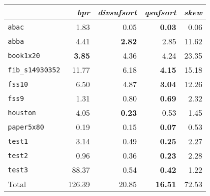\begin{tabular}{l r r r r } \toprule
 & \emph{bpr} & \emph{divsufsort} & \emph{qsufsort} & \emph{skew}\\ \midrule
\texttt{abac} & 1.83 & 0.05 & \textbf{0.03} & 0.06\\
\texttt{abba} & 4.41 & \textbf{2.82} & 2.85 & 11.62\\
\texttt{book1x20} & \textbf{3.85} & 4.36 & 4.24 & 23.35\\
\texttt{fib\_s14930352} & 11.77 & 6.18 & \textbf{4.15} & 15.18\\
\texttt{fss10} & 6.50 & 4.87 & \textbf{3.04} & 12.26\\
\texttt{fss9} & 1.31 & 0.80 & \textbf{0.69} & 2.32\\
\texttt{houston} & 4.05 & \textbf{0.23} & 0.53 & 1.45\\
\texttt{paper5x80} & 0.19 & 0.15 & \textbf{0.07} & 0.53\\
\texttt{test1} & 3.14 & 0.49 & \textbf{0.25} & 2.27\\
\texttt{test2} & 0.96 & 0.36 & \textbf{0.23} & 2.28\\
\texttt{test3} & 88.37 & 0.54 & \textbf{0.42} & 1.22\\
 \midrule
Total & 126.39 & 20.85 & \textbf{16.51} & 72.53\\
 \bottomrule
\end{tabular}
